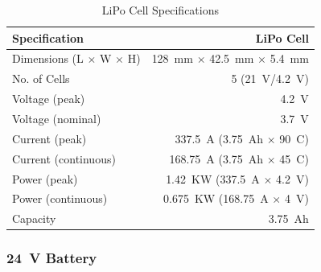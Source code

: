 \documentclass[main.tex]{subfiles}
\begin{document}
    \begin{table}[H!]
        \centering
        \begin{tabular}{@{}lr@{}} \toprule
            Specification & LiPo Cell\\ \midrule
            Dimensions (L $\times$ W $\times$ H) & \SI{128}{mm} $\times$ \SI{42.5}{mm} $\times$ \SI{5.4}{mm}\\
            No. of Cells & 5 (\SI{21}{V}/\SI{4.2}{V})\\
            Voltage (peak) & \SI{4.2}{V}\\
            Voltage (nominal) & \SI{3.7}{V}\\
            Current (peak) & \SI{337.5}{A} (\SI{3.75}{Ah} $\times$ \SI{90}{C})\\
            Current (continuous) & \SI{168.75}{A} (\SI{3.75}{Ah} $\times$ \SI{45}{C})\\
            Power (peak) & \SI{1.42}{KW} (\SI{337.5}{A} $\times$ \SI{4.2}{V})\\
            Power (continuous) & \SI{0.675}{KW} (\SI{168.75}{A} $\times$ \SI{4}{V})\\
            Capacity & \SI{3.75}{Ah}\\ \bottomrule
        \end{tabular}
        \caption{LiPo Cell Specifications}
        \label{tab:cell-specs}
    \end{table}
	
    \subsubsection{\textbf{\SI{24}{V}} Battery}
\end{document}
